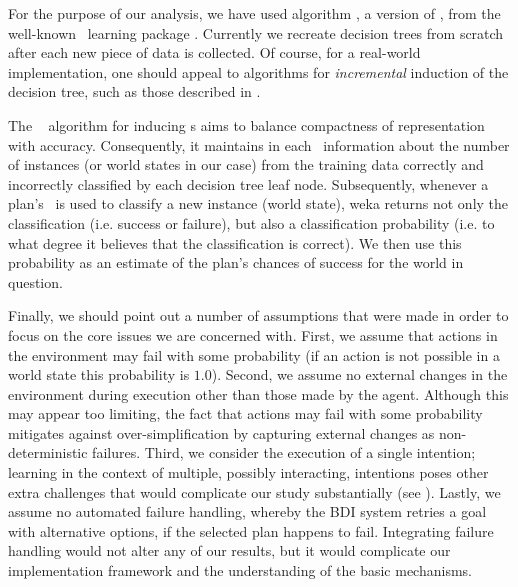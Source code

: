 For the purpose of our analysis, we have used algorithm
, a version of  \cite{Mitchell97:ML}, from the
well-known \weka\ learning package \cite{weka99}. Currently we
recreate decision trees from scratch after each new piece of data is collected.
Of course, for a real-world implementation, one should appeal to algorithms for
\emph{incremental} induction of the decision tree, such as those described in
\cite{Swere06:Fast,Utgoff97Decision}.

The \weka\  algorithm for inducing \dt{}s aims to balance
compactness of representation with accuracy. Consequently, it maintains in each
\dt\ information about the number of instances (or world states in our case) from
the training data correctly and incorrectly classified by each decision tree leaf
node. Subsequently, whenever a plan's \dt\ is used to classify a new instance
(world state), weka returns not only the classification (i.e. success or
failure), but also a classification probability (i.e. to what degree it believes
that the classification is correct). We then use this probability as an estimate
of the plan's chances of success for the world in question.


Finally, we should point out a number of assumptions that were made in order to
focus on the core issues we are concerned with.
First, we assume that actions in the environment may fail with some probability
(if an action is not possible in a world state this probability is $1.0$).
Second, we assume no external changes in the environment during execution other
than those made by the agent. Although this may appear too limiting, the fact
that actions may fail with some probability mitigates against
over-simplification by capturing external changes as
non-deterministic failures.
Third, we consider the execution of a single intention; learning in the context
of multiple, possibly interacting, intentions poses other extra challenges that
would complicate our study substantially (see \cite{Thangarajah02}).
Lastly, we assume no automated failure handling, whereby the BDI system retries
a goal with alternative options, if the selected plan happens to fail. 
Integrating failure handling would not alter any of our results, but it would
complicate our implementation framework and the understanding of the basic
mechanisms.



